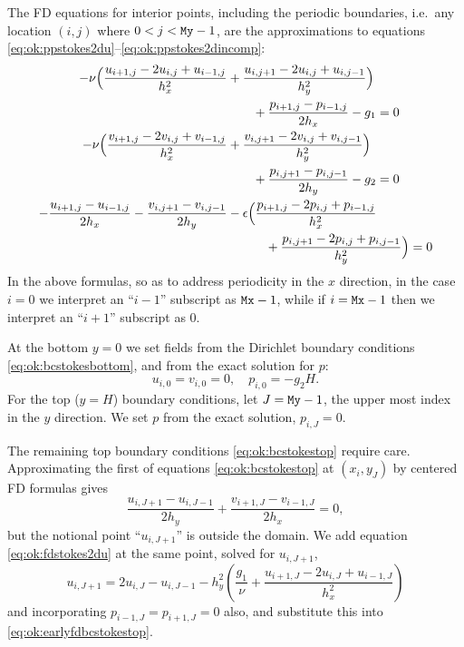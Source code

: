 The FD equations for interior points, including the periodic boundaries, i.e.~any location $(i,j)$ where $0 < j < \text{\texttt{My}}-1$, are the approximations to equations \eqref{eq:ok:ppstokes2du}--\eqref{eq:ok:ppstokes2dincomp}:
\begin{align}
-\nu \Big(\frac{u_{i+1,j} - 2 u_{i,j} + u_{i-1,j}}{h_x^2} &+ \frac{u_{i,j+1} - 2 u_{i,j} + u_{i,j-1}}{h_y^2}\Big) \notag \\
&\qquad + \frac{p_{i+1,j}-p_{i-1,j}}{2h_x} - g_1 = 0 \label{eq:ok:fdstokes2du} \\
-\nu \Big(\frac{v_{i+1,j} - 2 v_{i,j} + v_{i-1,j}}{h_x^2} &+ \frac{v_{i,j+1} - 2 v_{i,j} + v_{i,j-1}}{h_y^2}\Big) \notag \\
&\qquad + \frac{p_{i,j+1}-p_{i,j-1}}{2h_y} - g_2 = 0 \label{eq:ok:fdstokes2dv} \\
- \frac{u_{i+1,j}-u_{i-1,j}}{2h_x} - \frac{v_{i,j+1}-v_{i,j-1}}{2h_y} &- \epsilon \Big(\frac{p_{i+1,j} - 2 p_{i,j} + p_{i-1,j}}{h_x^2} \notag \\
&\qquad\quad + \frac{p_{i,j+1} - 2 p_{i,j} + p_{i,j-1}}{h_y^2}\Big) = 0 \label{eq:ok:fdstokes2dincomp}
\end{align}
In the above formulas, so as to address periodicity in the $x$ direction, in the case $i=0$ we interpret an ``$i-1$'' subscript as $\text{\texttt{Mx}}-1$, while if $i=\text{\texttt{Mx}}-1$ then we interpret an ``$i+1$'' subscript as $0$.

At the bottom $y=0$ we set fields from the Dirichlet boundary conditions \eqref{eq:ok:bcstokesbottom}, and from the exact solution for $p$:
\begin{equation}
  u_{i,0} = v_{i,0} = 0, \quad p_{i,0} = - g_2 H. \label{eq:ok:fdbcstokesbottom}
\end{equation}
For the top ($y=H$) boundary conditions, let $J=\text{\texttt{My}}-1$, the upper most index in the $y$ direction.  We set $p$ from the exact solution, $p_{i,J} = 0$.

The remaining top boundary conditions \eqref{eq:ok:bcstokestop} require care.  Approximating the first of equations \eqref{eq:ok:bcstokestop} at $(x_i,y_J)$ by centered FD formulas gives
\begin{equation}
  \frac{u_{i,J+1}-u_{i,J-1}}{2h_y} + \frac{v_{i+1,J}-v_{i-1,J}}{2h_x} = 0, \label{eq:ok:earlyfdbcstokestop}
\end{equation}
but the notional point ``$u_{i,J+1}$'' is outside the domain.  We add equation \eqref{eq:ok:fdstokes2du} at the same point, solved for $u_{i,J+1}$,
\begin{equation}
  u_{i,J+1} = 2 u_{i,J} - u_{i,J-1} - h_y^2 \left(\frac{g_1}{\nu} + \frac{u_{i+1,J} - 2 u_{i,J} + u_{i-1,J}}{h_x^2}\right) \label{eq:ok:earlyfdstokes2dutop} 
\end{equation}
and incorporating $p_{i-1,J}=p_{i+1,J}=0$ also, and substitute this into \eqref{eq:ok:earlyfdbcstokestop}.

